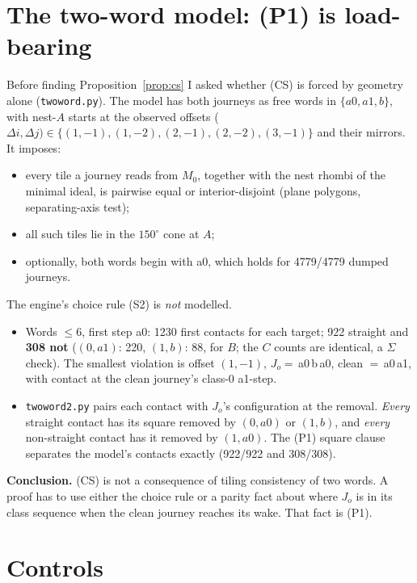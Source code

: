 \documentclass[11pt]{article}
\theoremstyle{definition}\newtheorem{definition}[theorem]{Definition}\newtheorem{remark}[theorem]{Remark}
\begin{document}
\section{The two-word model: (P1) is load-bearing}\label{sec:model}
Before finding Proposition~\ref{prop:cs} I asked whether (CS) is forced by geometry alone (\texttt{twoword.py}).
The model has both journeys as free words in $\{a0,a1,b\}$, with nest-$A$ starts at the observed offsets ($\Delta i,\Delta j)\in\{(1,-1),(1,-2),(2,-1),(2,-2),(3,-1)\}$ and their mirrors. It imposes:
\begin{itemize}
\item every tile a journey reads from $M_0$, together with the nest rhombi of the minimal ideal, is pairwise equal or interior-disjoint (plane polygons, separating-axis test);
\item all such tiles lie in the $150^\circ$ cone at $A$;
\item optionally, both words begin with a0, which holds for 4779/4779 dumped journeys.
\end{itemize}
The engine's choice rule (S2) is \emph{not} modelled.
\begin{itemize}
\item Words $\le6$, first step a0: 1230 first contacts for each target; 922 straight and \textbf{308 not} ($(0,a1)$: 220, $(1,b)$: 88, for $B$; the $C$ counts are identical, a $\Sigma$ check).
The smallest violation is offset $(1,-1)$, $J_o=$\,a0\,b\,a0, clean $=$\,a0\,a1, with contact at the clean journey's class-0 a1-step.
\item \texttt{twoword2.py} pairs each contact with $J_o$'s configuration at the removal. \emph{Every} straight contact has its square removed by $(0,a0)$ or $(1,b)$, and \emph{every} non-straight contact has it removed by $(1,a0)$. The (P1) square clause separates the model's contacts exactly (922/922 and 308/308).
\end{itemize}
\textbf{Conclusion.} (CS) is not a consequence of tiling consistency of two words. A proof has to use either the choice rule or a parity fact about where $J_o$ is in its class sequence when the clean journey reaches its wake. That fact is (P1).

\section{Controls}\label{sec:bb}
\end{document}
